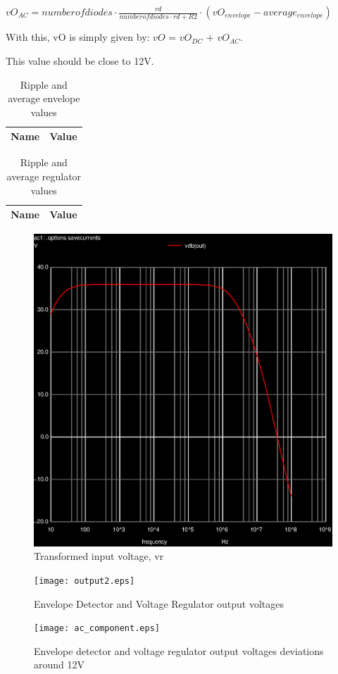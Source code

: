 $vO_{AC} = number of diodes \cdot \frac{rd}{number of diodes \cdot rd+R2} \cdot (vO_{envelope}-average_{envelope})$

With this, vO is simply given by: $vO$ = $vO_{DC}$ + $vO_{AC}$.

This value should be close to 12V.

\begin{table}[ht]
  \centering
  \begin{tabular}{|l|r|}
    \hline    
    {\bf Name} & {\bf Value} \\ \hline
	
  \end{tabular}
  \caption{Ripple and average envelope values}
	\label{tab:envelope}
\end{table}

\begin{table}[ht]
  \centering
  \begin{tabular}{|l|r|}
    \hline    
    {\bf Name} & {\bf Value} \\ \hline
        
  \end{tabular}
  \caption{Ripple and average regulator values} 
        \label{tab:regulator}
\end{table}     



\begin{figure}[h] \centering
\includegraphics[width=0.6\linewidth]{output.eps}
	\caption{Transformed input voltage, vr}
	\label{fig:output}
\end{figure}


\begin{figure}[h] \centering
\texttt{[image: output2.eps]}
	\caption{Envelope Detector and Voltage Regulator output voltages}
	\label{fig:output2}
\end{figure}

\begin{figure}[h] \centering                                          
\texttt{[image: ac\_component.eps]}          
	\caption{Envelope detector and voltage regulator output voltages deviations around 12V}                                   
        \label{fig:ac_dc}                                            
\end{figure}







